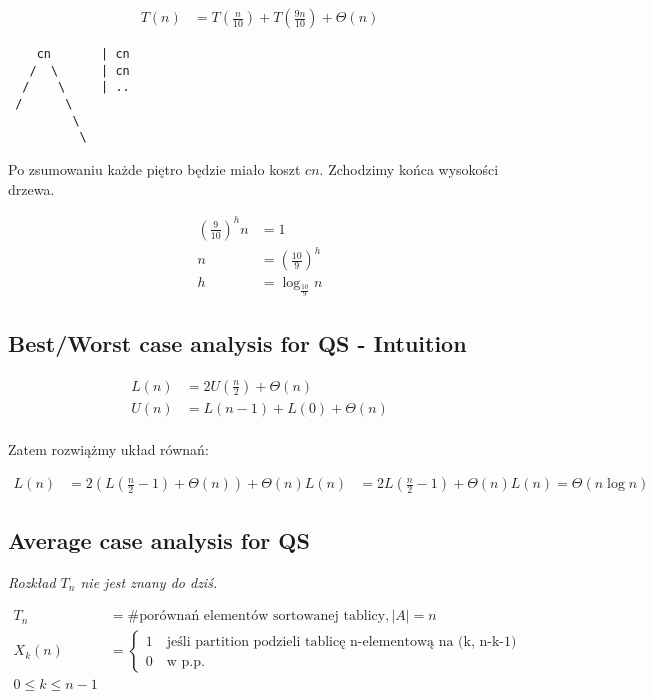 \documentclass{article}
\begin{document}
\begin{align}
    T(n) &= T(\frac{n}{10}) + T(\frac{9n}{10}) + \Theta(n)
\end{align}

\begin{verbatim}
    cn       | cn
   /  \      | cn
  /    \     | ..
 /      \
         \
          \   
\end{verbatim}

Po zsumowaniu każde piętro będzie miało koszt $cn$. Zchodzimy końca wysokości drzewa.

\begin{align}
    \left(\frac{9}{10}\right)^h n &= 1\\
    n &= \left(\frac{10}{9}\right)^h\\
    h &= \log_{\frac{10}{9}} n
\end{align}

\subsection{Best/Worst case analysis for QS - Intuition}

\begin{align}
    L(n) &= 2 U\left(\frac{n}{2}\right) + \Theta(n)\\
    U(n) &= L(n-1) + L(0) + \Theta(n)\\
\end{align}

Zatem rozwiążmy układ równań:

\begin{align}
    L(n) &= 2(L(\frac{n}{2} - 1) + \Theta(n)) + \Theta (n)
    L(n) &= 2L(\frac{n}{2} - 1) + \Theta(n)
    L(n) = \Theta(n \log n)
\end{align}

\subsection{Average case analysis for QS}

\textit{Rozkład $T_n$ nie jest znany do dziś.}

\begin{align}
    T_n &= \text{\# porównań elementów sortowanej tablicy}, |A|=n\\
    X_k(n) &= \begin{cases}
        1 \quad \text{jeśli partition podzieli tablicę n-elementową na (k, n-k-1)}\\
        0 \quad \text{w p.p.}
    \end{cases}\\
    0 \leq k \leq n - 1
\end{align}
\end{document}
